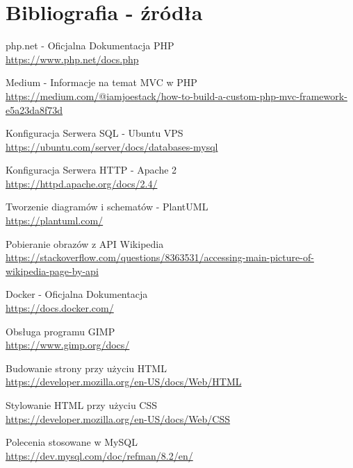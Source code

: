 
\section{Bibliografia - źródła }

\begin{thebibliography}{9}
    php.net - Oficjalna Dokumentacja PHP\\
    \url{https://www.php.net/docs.php}

    Medium - Informacje na temat MVC w PHP\\
    \url{https://medium.com/@iamjoestack/how-to-build-a-custom-php-mvc-framework-e5a23da8f73d}

    Konfiguracja Serwera SQL - Ubuntu VPS\\
    \url{https://ubuntu.com/server/docs/databases-mysql}


    Konfiguracja Serwera HTTP -  Apache 2\\
    \url{https://httpd.apache.org/docs/2.4/}

    Tworzenie diagramów i schematów - PlantUML\\
    \url{https://plantuml.com/}


    Pobieranie obrazów z API Wikipedia\\
    \url{https://stackoverflow.com/questions/8363531/accessing-main-picture-of-wikipedia-page-by-api}


    Docker - Oficjalna Dokumentacja\\
    \url{ https://docs.docker.com/}

    Obsługa programu GIMP\\
    \url{https://www.gimp.org/docs/}

    Budowanie strony przy użyciu HTML\\
    \url{https://developer.mozilla.org/en-US/docs/Web/HTML}

    Stylowanie HTML przy użyciu CSS\\
    \url{https://developer.mozilla.org/en-US/docs/Web/CSS}

    Polecenia stosowane w MySQL\\
    \url{https://dev.mysql.com/doc/refman/8.2/en/}

    
\end{thebibliography}
